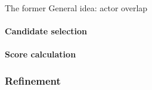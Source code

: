 The former 
General idea: actor overlap

\paragraph{Candidate selection}

\paragraph{Score calculation}

\subsubsection{Refinement}